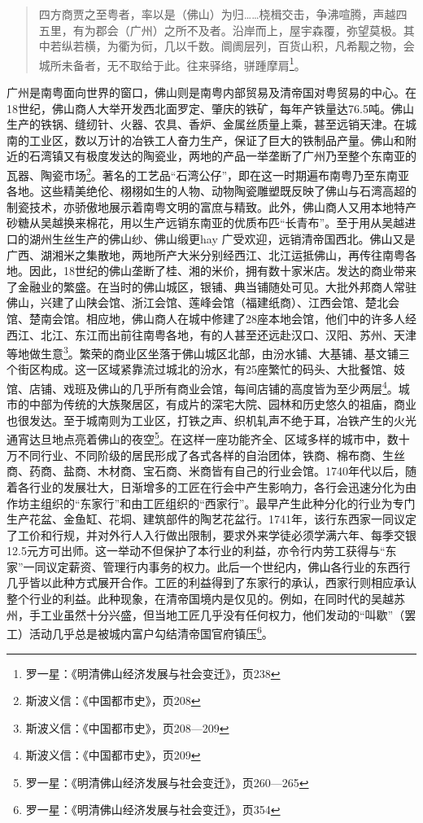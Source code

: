 \begin{quote}

四方商贾之至粤者，率以是（佛山）为归……桡楫交击，争沸喧腾，声越四五里，有为郡会（广州）之所不及者。沿岸而上，屋宇森覆，弥望莫极。其中若纵若横，为衢为衏，几以千数。阛阓层列，百货山积，凡希觏之物，会城所未备者，无不取给于此。往来驿络，骈踵摩肩\footnote{罗一星：《明清佛山经济发展与社会变迁》，页238}。

\end{quote}

广州是南粤面向世界的窗口，佛山则是南粤内部贸易及清帝国对粤贸易的中心。在18世纪，佛山商人大举开发西北面罗定、肇庆的铁矿，每年产铁量达76.5吨。佛山生产的铁锅、缝纫针、火器、农具、香炉、金属丝质量上乘，甚至远销天津。在城南的工业区，数以万计的冶铁工人奋力生产，保证了巨大的铁制品产量。佛山和附近的石湾镇又有极度发达的陶瓷业，两地的产品一举垄断了广州乃至整个东南亚的瓦器、陶瓷市场\footnote{斯波义信：《中国都市史》，页208}。著名的工艺品“石湾公仔”，即在这一时期遍布南粤乃至东南亚各地。这些精美绝伦、栩栩如生的人物、动物陶瓷雕塑既反映了佛山与石湾高超的制瓷技术，亦骄傲地展示着南粤文明的富庶与精致。此外，佛山商人又用本地特产砂糖从吴越换来棉花，用以生产远销东南亚的优质布匹“长青布”。至于用从吴越进口的湖州生丝生产的佛山纱、佛山缎更hay 广受欢迎，远销清帝国西北。佛山又是广西、湖湘米之集散地，两地所产大米分别经西江、北江运抵佛山，再传往南粤各地。因此，18世纪的佛山垄断了桂、湘的米价，拥有数十家米店。发达的商业带来了金融业的繁盛。在当时的佛山城区，银铺、典当铺随处可见。大批外邦商人常驻佛山，兴建了山陕会馆、浙江会馆、莲峰会馆（福建纸商）、江西会馆、楚北会馆、楚南会馆。相应地，佛山商人在城中修建了28座本地会馆，他们中的许多人经西江、北江、东江而出前往南粤各地，有的人甚至还远赴汉口、汉阳、苏州、天津等地做生意\footnote{斯波义信：《中国都市史》，页208—209}。繁荣的商业区坐落于佛山城区北部，由汾水铺、大基铺、基文铺三个街区构成。这一区域紧靠流过城北的汾水，有25座繁忙的码头、大批餐馆、妓馆、店铺、戏班及佛山的几乎所有商业会馆，每间店铺的高度皆为至少两层\footnote{斯波义信：《中国都市史》，页209}。城市的中部为传统的大族聚居区，有成片的深宅大院、园林和历史悠久的祖庙，商业也很发达。至于城南则为工业区，打铁之声、织机轧声不绝于耳，冶铁产生的火光通宵达旦地点亮着佛山的夜空\footnote{罗一星：《明清佛山经济发展与社会变迁》，页260—265}。在这样一座功能齐全、区域多样的城市中，数十万不同行业、不同阶级的居民形成了各式各样的自治团体，铁商、棉布商、生丝商、药商、盐商、木材商、宝石商、米商皆有自己的行业会馆。1740年代以后，随着各行业的发展壮大，日渐增多的工匠在行会中产生影响力，各行会迅速分化为由作坊主组织的“东家行”和由工匠组织的“西家行”。最早产生此种分化的行业为专门生产花盆、金鱼缸、花垌、建筑部件的陶艺花盆行。1741年，该行东西家一同议定了工价和行规，并对外行人入行做出限制，要求外来学徒必须学满六年、每季交银12.5元方可出师。这一举动不但保护了本行业的利益，亦令行内劳工获得与“东家”一同议定薪资、管理行内事务的权力。此后一个世纪内，佛山各行业的东西行几乎皆以此种方式展开合作。工匠的利益得到了东家行的承认，西家行则相应承认整个行业的利益。此种现象，在清帝国境内是仅见的。例如，在同时代的吴越苏州，手工业虽然十分兴盛，但当地工匠几乎没有任何权力，他们发动的“叫歇”（罢工）活动几乎总是被城内富户勾结清帝国官府镇压\footnote{罗一星：《明清佛山经济发展与社会变迁》，页354}。

